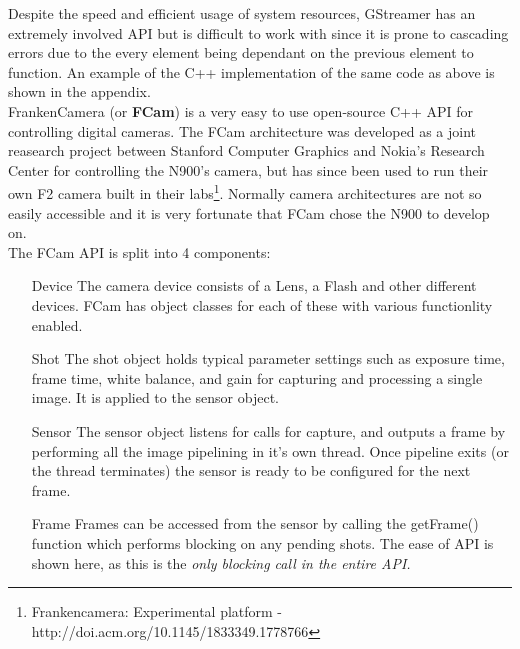 \documentclass[11pt]{article} %
\begin{document}
Despite the speed and efficient usage of system resources, GStreamer has an extremely involved API but is difficult to work with since it is prone to cascading errors due to the every element being dependant on the previous element to function. An example of the C++ implementation of the same code as above is shown in the appendix.\\

FrankenCamera (or {\bf FCam}) is a very easy to use open-source C++ API for controlling digital cameras.  The FCam architecture was developed as a joint reasearch project between Stanford Computer Graphics and Nokia's Research Center for controlling the N900's camera, but has since been used to run their own F2 camera built in their labs\footnote{Frankencamera: Experimental platform - http://doi.acm.org/10.1145/1833349.1778766}\label{ref:fcamdoc}. Normally camera architectures are not so easily accessible and it is very fortunate that FCam chose the N900 to develop on.
\pagebreak
\\The FCam API is split into 4 components:
\begin{enumerate}
\item[Device]{The camera device consists of a Lens, a Flash and other different devices. FCam has object classes for each of these with various functionlity enabled.}
\item[Shot]{The shot object holds typical parameter settings such as exposure time, frame time, white balance, and gain for capturing and processing a single image. It is applied to the sensor object.}
\item[Sensor]{The sensor object listens for calls for capture, and outputs a frame by performing all the image pipelining in it's own thread. Once pipeline exits (or the thread terminates) the sensor is ready to be configured for the next frame.}
\item[Frame]{Frames can be accessed from the sensor by calling the getFrame() function which performs blocking on any pending shots. The ease of API is shown here, as this is the \it{only} blocking call in the entire API.}
\end{enumerate}
\end{document}
